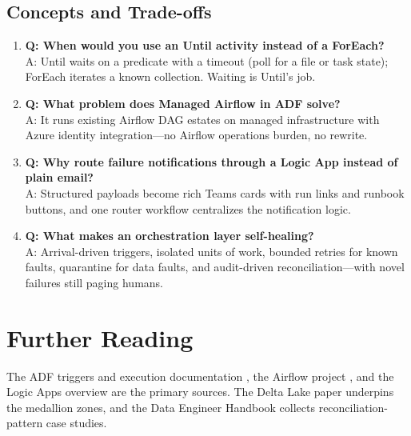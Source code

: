 \subsection{Concepts and Trade-offs}
\begin{enumerate}
    \item \textbf{Q: When would you use an Until activity instead of a ForEach?}\\
    A: Until waits on a predicate with a timeout (poll for a file or task state); ForEach iterates a known collection. Waiting is Until's job.
    \item \textbf{Q: What problem does Managed Airflow in ADF solve?}\\
    A: It runs existing Airflow DAG estates on managed infrastructure with Azure identity integration---no Airflow operations burden, no rewrite.
    \item \textbf{Q: Why route failure notifications through a Logic App instead of plain email?}\\
    A: Structured payloads become rich Teams cards with run links and runbook buttons, and one router workflow centralizes the notification logic.
    \item \textbf{Q: What makes an orchestration layer self-healing?}\\
    A: Arrival-driven triggers, isolated units of work, bounded retries for known faults, quarantine for data faults, and audit-driven reconciliation---with novel failures still paging humans.
\end{enumerate}

\section{Further Reading}
The ADF triggers and execution documentation \cite{microsoft2025adfTriggers}, the Airflow project \cite{apache2025airflow}, and the Logic Apps overview \cite{microsoft2025logicApps} are the primary sources. The Delta Lake paper \cite{armbrust2020delta} underpins the medallion zones, and the Data Engineer Handbook \cite{dataexpert2025handbook} collects reconciliation-pattern case studies.

